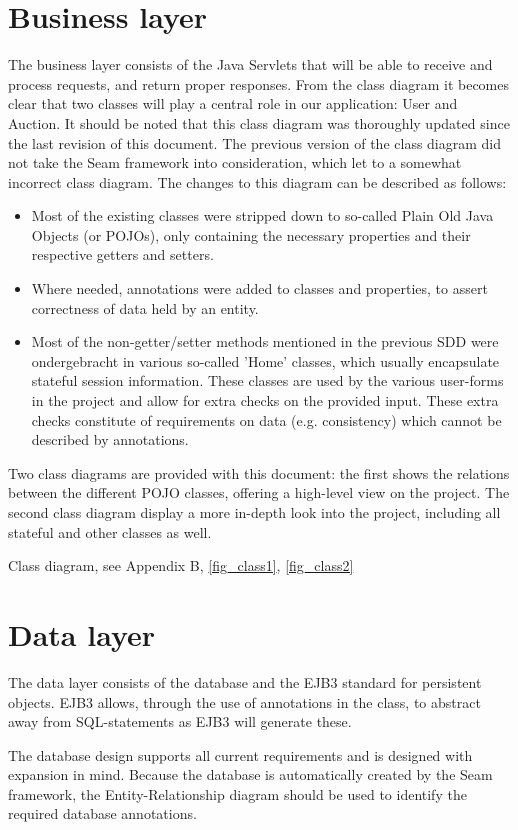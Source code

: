 \documentclass[salesmen, twoside]{../../../templates/latex/2009/softproj}
\begin{document}
\begin{projdoc}
\section{Business layer}
The business layer consists of the Java Servlets that will be able to receive and process requests, and return proper responses.
From the class diagram it becomes clear that two classes will play a central role in our application: User and Auction. It should be noted that this class diagram was thoroughly updated since the last revision of this document. The previous version of the class diagram did not take the Seam framework into consideration, which let to a somewhat incorrect class diagram. The changes to this diagram can be described as follows:
\begin{itemize}
\item Most of the existing classes were stripped down to so-called Plain Old Java Objects (or POJOs), only containing the necessary properties and their respective getters and setters.
\item Where needed, annotations were added to classes and properties, to assert correctness of data held by an entity.
\item Most of the non-getter/setter methods mentioned in the previous SDD were ondergebracht in various so-called 'Home' classes, which usually encapsulate stateful session information. These classes are used by the various user-forms in the project and allow for extra checks on the provided input. These extra checks constitute of requirements on data (e.g. consistency) which cannot be described by annotations.
\end{itemize}

Two class diagrams are provided with this document: the first shows the relations between the different POJO classes, offering a high-level view on the project. The second class diagram display a more in-depth look into the project, including all stateful and other classes as well.

Class diagram, see Appendix B, \ref{fig_class1}, \ref{fig_class2}

\section{Data layer}
The data layer consists of the database and the EJB3 standard for persistent objects. EJB3 allows, through the use of annotations in the class, to abstract away from SQL-statements as EJB3 will generate these.

The database design supports all current requirements and is designed with expansion in mind. Because the database is automatically created by the Seam framework, the Entity-Relationship diagram should be used to identify the required database annotations.


\end{projdoc}
\end{document}

